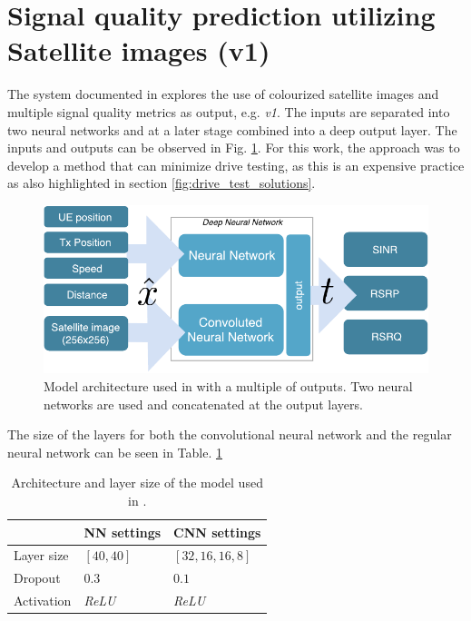 \section{Signal quality prediction utilizing Satellite images (v1)}
The system documented in \cite{Thrane2018DriveApproximation} explores the use of colourized satellite images and multiple signal quality metrics as output, e.g. \emph{v1}. The inputs are separated into two neural networks and at a later stage combined into a deep output layer. The inputs and outputs can be observed in Fig. \ref{fig:dnn_architecture_drive_test_minimization}. For this work, the approach was to develop a method that can minimize drive testing, as this is an expensive practice as also highlighted in section \ref{fig:drive_test_solutions}.

\begin{figure}
    \centering
    \includegraphics{chapters/part_pathloss/drive_test_minimzation_paper/input_output_figure.pdf}
    \caption{Model architecture used in \cite{Thrane2018DriveApproximation} with a multiple of outputs. Two neural networks are used and concatenated at the output layers.}
    \label{fig:dnn_architecture_drive_test_minimization}
\end{figure}

The size of the layers for both the convolutional neural network and the regular neural network can be seen in Table. \ref{tab:dnn_architecture_drive_test_minimization}

\begin{table}[ht]
  \centering
  \caption{Architecture and layer size of the model used in \cite{Thrane2018DriveApproximation}.}
  \label{tab:dnn_architecture_drive_test_minimization}
  \begin{tabular}{l|l|l}
                & NN settings     & CNN settings      \\ \hline
  Layer size & $[40, 40]$      & $[32, 16, 16, 8]$ \\
  Dropout       & $0.3$           & $0.1$             \\
  Activation    & \textit{ReLU} & \textit{ReLU}  
\end{tabular}
\end{table}

